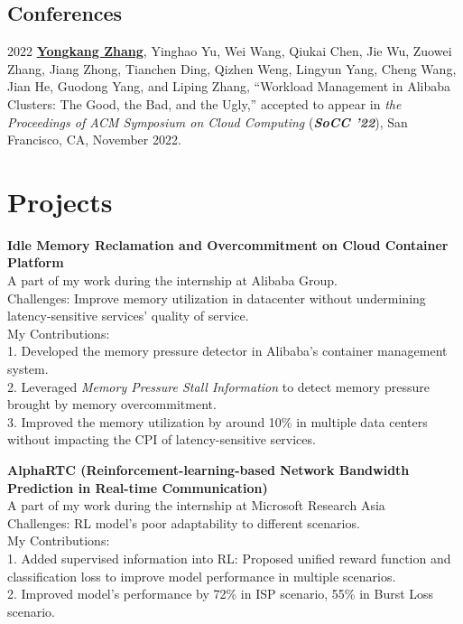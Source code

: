 \documentclass[12pt,letterpaper]{report}
\begin{document}
    \subsection*{Conferences}

    \begin{tablist}

        \item[2022] \tab{} \underline{\textbf{Yongkang Zhang}}, Yinghao Yu, Wei Wang, Qiukai Chen, Jie Wu, Zuowei Zhang, Jiang Zhong, Tianchen Ding, Qizhen Weng, Lingyun Yang, Cheng Wang, Jian He, Guodong Yang, and Liping Zhang, ``Workload Management in Alibaba Clusters: The Good, the Bad, and the Ugly,'' accepted to appear in \textit{the Proceedings of ACM Symposium on Cloud Computing} (\textit{\textbf{SoCC '22}}), San Francisco, CA, November 2022.
    \end{tablist}

\section*{Projects}

\textbf{Idle Memory Reclamation and Overcommitment on Cloud Container Platform}\\
A part of my work during the internship at Alibaba Group.\\
Challenges: Improve memory utilization in datacenter without undermining latency-sensitive services' quality of service.\\
My Contributions:\\
1. Developed the memory pressure detector in Alibaba's container management system.\\
2. Leveraged \textit{Memory Pressure Stall Information} to detect memory pressure brought by memory overcommitment.\\
3. Improved the memory utilization by around 10\% in multiple data centers without impacting the CPI of latency-sensitive services.

\vspace{0.5em}
\textbf{AlphaRTC (Reinforcement-learning-based Network Bandwidth Prediction in Real-time Communication)}\\
A part of my work during the internship at Microsoft Research Asia\\
Challenges: RL model's poor adaptability to different scenarios.\\
My Contributions:\\
1. Added supervised information into RL: Proposed unified reward function and classification loss to improve model performance in multiple scenarios.\\
2. Improved model's performance by 72\% in ISP scenario, 55\% in Burst Loss scenario.
\end{document}
